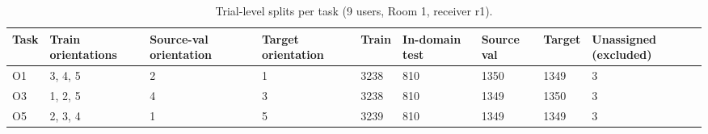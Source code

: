 \begin{table}[t]
\centering
\small
\caption{Trial-level splits per task (9 users, Room 1, receiver r1).}
\label{tab:T1a_splits}
\begin{tabular}{lllllllll}
\hline
Task & Train orientations & Source-val orientation & Target orientation & Train & In-domain test & Source val & Target & Unassigned (excluded) \\
\hline
O1 & 3, 4, 5 & 2 & 1 & 3238 & 810 & 1350 & 1349 & 3 \\
O3 & 1, 2, 5 & 4 & 3 & 3238 & 810 & 1349 & 1350 & 3 \\
O5 & 2, 3, 4 & 1 & 5 & 3239 & 810 & 1349 & 1349 & 3 \\
\hline
\end{tabular}
\end{table}
